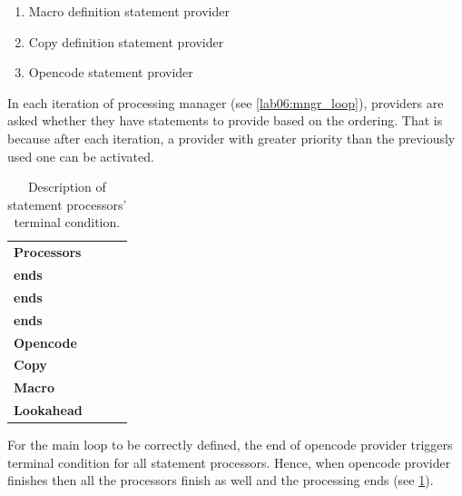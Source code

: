 \begin{enumerate}
	\item Macro definition statement provider
	\item Copy definition statement provider
	\item Opencode statement provider
\end{enumerate}

In each iteration of processing manager (see \cref{lab06:mngr_loop}), providers are asked whether they have statements to provide based on the ordering. That is because after each iteration, a provider with greater priority than the previously used one can be activated. 


\begin{table}
	\centering
	\begin{tabular}{@{}p{}ccc@{}}
		\textbf{Processors} & \thead{\textbf{Macro provider} \\ \textbf{ends}} & \thead{\textbf{Copy provider} \\ \textbf{ends}} & \thead{\textbf{Opencode provider} \\ \textbf{ends}} \\ \toprule
		\textbf{Opencode}   &                      \cont                       &                      \cont                      &                        \fin                         \\
		\textbf{Copy}       &                      \cont                       &                      \cont                      &                        \fin                         \\
		\textbf{Macro}      &                       \fin                       &                      \cont                      &                        \fin                         \\
		\textbf{Lookahead}  &                       \fin                       &                      \cont                      &                        \fin                         \\ \bottomrule
	\end{tabular}
	\caption{Description of statement processors' terminal condition.}
	\label{tab06:term_cond}
\end{table}

For the main loop to be correctly defined, the end of opencode provider triggers terminal condition for all statement processors. Hence, when opencode provider finishes then all the processors finish as well and the processing ends (see \cref{tab06:term_cond}).

